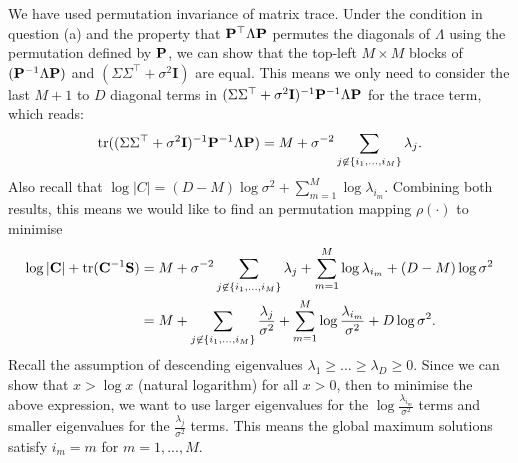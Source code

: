 We have used permutation invariance of matrix trace. Under the condition in question (a) and the property that $\mathbf{P}^\top \Lambda \mathbf{P}$ permutes the diagonals of $\Lambda$ using the permutation defined by $\mathbf{P}$, we can show that the top-left $M \times M$ blocks of $(\mathbf{P}^{-1} \Lambda \mathbf{P})$ and $(\Sigma \Sigma^{\top} + \sigma^2 \mathbf{I})$ are equal. This means we only need to consider the last $M+1$ to $D$ diagonal terms in $(\Sigma \Sigma^\top + \sigma^2 \mathbf{I})^{-1} \mathbf{P}^{-1}  \Lambda \mathbf{P}$ for the trace term, which reads:
$$\text{tr}( (\Sigma \Sigma^\top + \sigma^2 \mathbf{I})^{-1} \mathbf{P}^{-1}  \Lambda \mathbf{P}) = M + \sigma^{-2} \sum_{j \not \in \{i_1, ..., i_M \}} \lambda_j.$$
%
Also recall that $\log |C| = (D - M) \log \sigma^2 + \sum_{m=1}^M \log \lambda_{i_m}$. Combining both results, this means we would like to find an permutation mapping $\rho(\cdot)$ to minimise
\begin{equation*}
\begin{aligned}
\log |\mathbf C | + \text{tr}( \mathbf C^{-1} \mathbf{S}) &=  M + \sigma^{-2} \sum_{j \not \in \{i_1, ..., i_M \}} \lambda_j + \sum_{m=1}^M \log \lambda_{i_m} + (D - M) \log \sigma^2 \\
&= M + \sum_{j \not \in \{i_1, ..., i_M \}} \frac{ \lambda_j}{\sigma^2} + \sum_{m=1}^M \log \frac{ \lambda_{i_m}}{\sigma^2} + D \log \sigma^2.
\end{aligned}
\end{equation*}
%
Recall the assumption of descending eigenvalues $\lambda_1 \geq ... \geq \lambda_D \geq 0$. Since we can show that $x > \log x$ (natural logarithm) for all $x > 0$, then to minimise the above expression, we want to use larger eigenvalues for the $\log \frac{ \lambda_{i_m}}{\sigma^2}$ terms and smaller eigenvalues for the $\frac{ \lambda_j}{\sigma^2}$ terms. This means the global maximum solutions satisfy $i_m = m$ for $m = 1, ..., M$.

